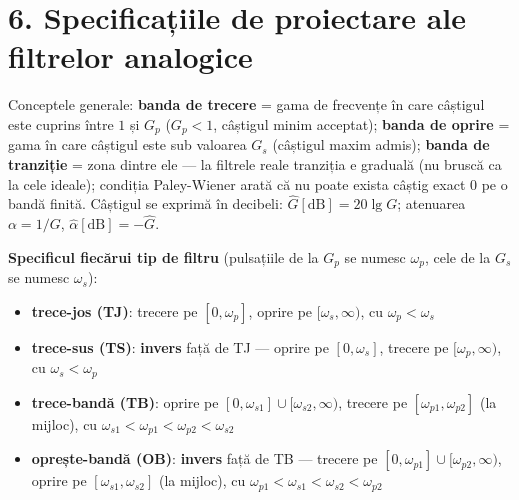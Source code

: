 \documentclass[10pt,a4paper]{article}
\begin{document}
\section*{6. Specificațiile de proiectare ale filtrelor analogice}
Conceptele generale: \textbf{banda de trecere} = gama de frecvențe în care câștigul este cuprins între $1$ și $G_p$ ($G_p<1$, câștigul minim acceptat); \textbf{banda de oprire} = gama în care câștigul este sub valoarea $G_s$ (câștigul maxim admis); \textbf{banda de tranziție} = zona dintre ele — la filtrele reale tranziția e graduală (nu bruscă ca la cele ideale); condiția Paley-Wiener arată că nu poate exista câștig exact $0$ pe o bandă finită. Câștigul se exprimă în decibeli: $\hat{G}[\mathrm{dB}]=20\lg G$; atenuarea $\alpha=1/G$, $\hat\alpha[\mathrm{dB}]=-\hat G$.

\textbf{Specificul fiecărui tip de filtru} (pulsațiile de la $G_p$ se numesc $\omega_p$, cele de la $G_s$ se numesc $\omega_s$):
\begin{itemize}
\item \textbf{trece-jos (TJ)}: trecere pe $[0,\omega_p]$, oprire pe $[\omega_s,\infty)$, cu $\omega_p<\omega_s$
\item \textbf{trece-sus (TS)}: \textbf{invers} față de TJ — oprire pe $[0,\omega_s]$, trecere pe $[\omega_p,\infty)$, cu $\omega_s<\omega_p$
\item \textbf{trece-bandă (TB)}: oprire pe $[0,\omega_{s1}]\cup[\omega_{s2},\infty)$, trecere pe $[\omega_{p1},\omega_{p2}]$ (la mijloc), cu $\omega_{s1}<\omega_{p1}<\omega_{p2}<\omega_{s2}$
\item \textbf{oprește-bandă (OB)}: \textbf{invers} față de TB — trecere pe $[0,\omega_{p1}]\cup[\omega_{p2},\infty)$, oprire pe $[\omega_{s1},\omega_{s2}]$ (la mijloc), cu $\omega_{p1}<\omega_{s1}<\omega_{s2}<\omega_{p2}$
\end{itemize}
\end{document}

